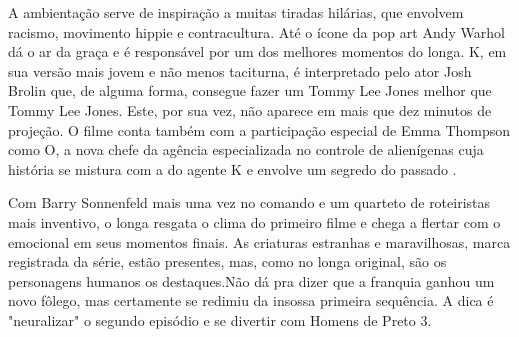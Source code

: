\documentclass[a4paper,11pt,openright,openbib]{article}
\begin{document}
A ambientação serve de inspiração a muitas tiradas hilárias, que envolvem racismo, movimento hippie e contracultura. Até o ícone da pop art Andy Warhol dá o ar da graça e é responsável por um dos melhores momentos do longa. K, em sua versão mais jovem e não menos taciturna, é interpretado pelo ator Josh Brolin que, de alguma forma, consegue fazer um Tommy Lee Jones melhor que Tommy Lee Jones. Este, por sua vez, não aparece em mais que dez minutos de projeção. O filme conta também com a participação especial de Emma Thompson como O, a nova chefe da agência especializada no controle de alienígenas cuja história se mistura com a do agente K e envolve um segredo do passado . 

Com Barry Sonnenfeld mais uma vez no comando e um quarteto de roteiristas mais inventivo, o longa resgata o clima do primeiro filme e chega a flertar com o emocional em seus momentos finais. As criaturas estranhas e maravilhosas, marca registrada da série, estão presentes, mas, como no longa original, são os personagens humanos os destaques.Não dá pra dizer que a franquia ganhou um novo fôlego, mas certamente se redimiu da insossa primeira sequência. A dica é "neuralizar" o segundo episódio e se divertir com Homens de Preto 3. 
\end{document}
